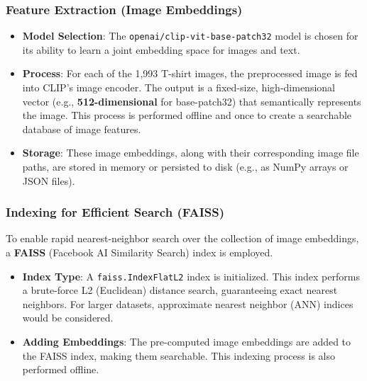 \documentclass{article}
\begin{document}
\subsubsection{Feature Extraction (Image Embeddings)}
\begin{itemize}
    \item \textbf{Model Selection}: The \texttt{openai/clip-vit-base-patch32} model is chosen for its ability to learn a joint embedding space for images and text.
    \item \textbf{Process}: For each of the 1,993 T-shirt images, the preprocessed image is fed into CLIP's image encoder. The output is a fixed-size, high-dimensional vector (e.g., \textbf{512-dimensional} for base-patch32) that semantically represents the image. This process is performed offline and once to create a searchable database of image features.
    \item \textbf{Storage}: These image embeddings, along with their corresponding image file paths, are stored in memory or persisted to disk (e.g., as NumPy arrays or JSON files).
\end{itemize}

\subsubsection{Indexing for Efficient Search (FAISS)}
To enable rapid nearest-neighbor search over the collection of image embeddings, a \textbf{FAISS} (Facebook AI Similarity Search) index is employed.
\begin{itemize}
    \item \textbf{Index Type}: A \texttt{faiss.IndexFlatL2} index is initialized. This index performs a brute-force L2 (Euclidean) distance search, guaranteeing exact nearest neighbors. For larger datasets, approximate nearest neighbor (ANN) indices would be considered.
    \item \textbf{Adding Embeddings}: The pre-computed image embeddings are added to the FAISS index, making them searchable. This indexing process is also performed offline.
\end{itemize}
\end{document}
